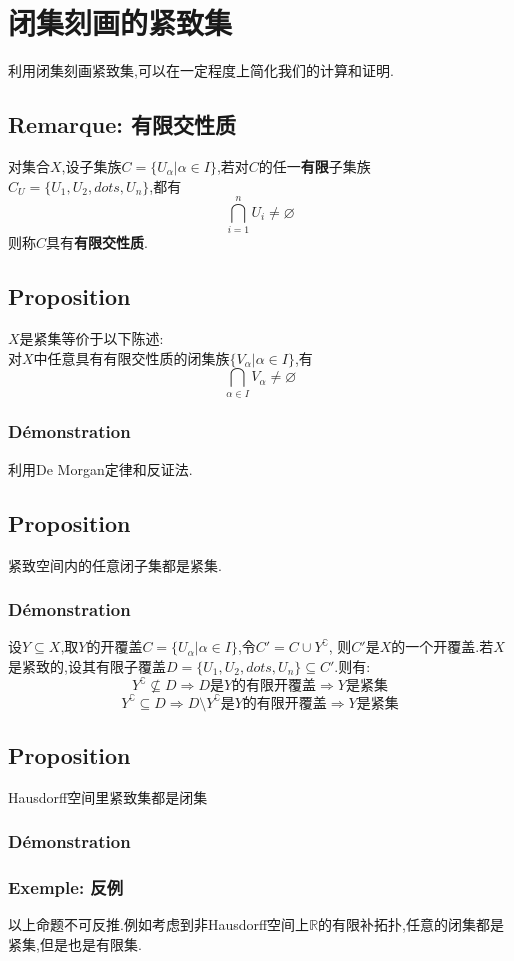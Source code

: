 \documentclass[12pt, a4paper, oneside]{ctexbook}
\begin{document}
  \section{闭集刻画的紧致集}
  利用闭集刻画紧致集,可以在一定程度上简化我们的计算和证明.
  \subsection{Remarque: 有限交性质}
  对集合$X$,设子集族$C=\{U_\alpha|\alpha\in I \}$,若对$C$的任一\textbf{有限}子集族$C_U=\{U_1,U_2,dots,U_n\}$,都有
  $$
  \bigcap_{i=1}^n U_i\neq \varnothing
  $$
  则称$C$具有\textbf{有限交性质}.
  \subsection{Proposition}
  \noindent
  $X$是紧集等价于以下陈述:\\
  对$X$中任意具有有限交性质的闭集族$\{V_\alpha|\alpha\in I\}$,有
  $$
    \bigcap_{\alpha\in I}V_\alpha\neq\varnothing
  $$
  \subsubsection{Démonstration}
  利用De Morgan定律和反证法.
   
  \subsection{Proposition}
  紧致空间内的任意闭子集都是紧集.
  \subsubsection{Démonstration}
  设$Y\subseteq X$,取$Y$的开覆盖$C=\{U_\alpha|\alpha\in I \}$,令$C'=C\cup Y^\complement$,
  则$C'$是$X$的一个开覆盖.若$X$是紧致的,设其有限子覆盖$D=\{U_1,U_2,dots,U_n\}\subseteq C'$.则有:
  $$
  Y^\complement\nsubseteq D\Rightarrow D\text{是}Y\text{的有限开覆盖}\Rightarrow Y\text{是紧集}
  $$
  $$
  Y^\complement\subseteq D\Rightarrow D\setminus Y^\complement \text{是}Y\text{的有限开覆盖}\Rightarrow Y\text{是紧集}
  $$
  \subsection{Proposition}
  Hausdorff空间里紧致集都是闭集
  \subsubsection{Démonstration}


  \subsubsection{Exemple: 反例}
  以上命题不可反推.例如考虑到非Hausdorff空间上$\mathbb{R}$的有限补拓扑,任意的闭集都是紧集,但是也是有限集.
\end{document}
